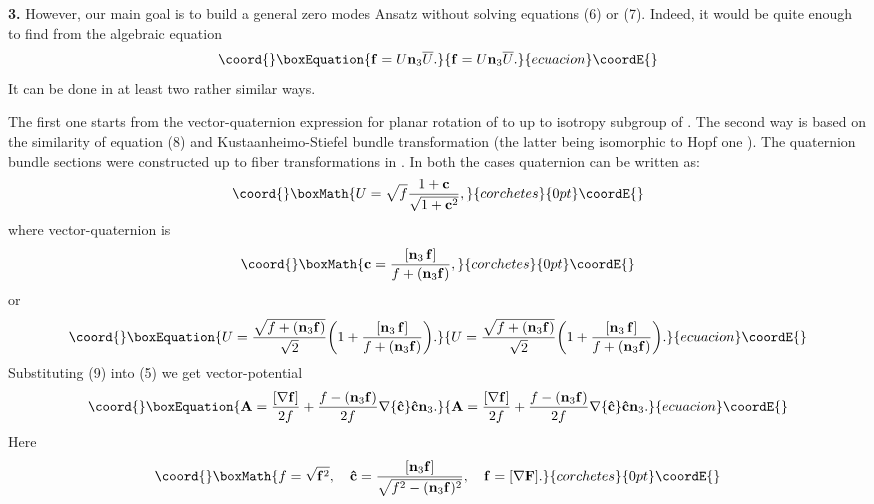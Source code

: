 \documentclass[12pt,a4paper]{article}
\begin{document}
{\bf 3.} However, our main goal is to build a general zero modes Ansatz without solving
equations (6) or (7). Indeed,  it would be quite enough to find \coordHE{} from
the algebraic equation
\begin{equation}\coord{}\boxEquation{
\mathbf{f}=U\mathbf{n}_3\overline{U}.
}{
\mathbf{f}=U\mathbf{n}_3\overline{U}.
}{ecuacion}\coordE{}\end{equation}
It can be done in at least two rather similar ways.

The first one starts from the vector-quaternion expression for planar \coordHE{} rotation of
\coordHE{} to \coordHE{} up to \coordHE{} isotropy subgroup of \coordHE{}
\cite{Fedorov}. The second way is based on the similarity of equation (8) and
Kustaanheimo-Stiefel bundle transformation \coordHE{}
(the latter being isomorphic to Hopf one \coordHE{}). The quaternion bundle
sections were constructed up to \coordHE{} fiber transformations in \cite{Pris1}.
In both the cases quaternion \coordHE{} can be written as:
\begin{displaymath}\coord{}\boxMath{
U=\sqrt{f}\frac{1+\mathbf{c}}{\sqrt{1+\mathbf{c}^2}},
}{corchetes}{0pt}\coordE{}\end{displaymath}
where vector-quaternion \coordHE{} is
\begin{displaymath}\coord{}\boxMath{
\mathbf{c}=
\frac{[\mathbf{n}_3\, \mathbf{f}]}{f+(\mathbf{n}_3\mathbf{f})},
}{corchetes}{0pt}\coordE{}\end{displaymath}
or
\begin{equation}\coord{}\boxEquation{
U =\frac{\sqrt{f+(\mathbf{n}_3\mathbf{f})}}{\sqrt{2}}\biggl(1+
\frac{[\mathbf{n}_3\, \mathbf{f}]}{f+(\mathbf{n}_3\mathbf{f})}
\biggr).
}{
U =\frac{\sqrt{f+(\mathbf{n}_3\mathbf{f})}}{\sqrt{2}}\biggl(1+
\frac{[\mathbf{n}_3\, \mathbf{f}]}{f+(\mathbf{n}_3\mathbf{f})}
\biggr).
}{ecuacion}\coordE{}\end{equation}
Substituting (9) into (5) we get vector-potential
\begin{equation}\coord{}\boxEquation{
\mathbf{A}=\frac{[\mathbf{\nabla}\mathbf{f}]}{2f}+
\frac{f-(\mathbf{n}_3\mathbf{f})}{2f}
\mathbf{\nabla}\{\mathbf{\hat{c}}\}\mathbf{\hat{c}}
\mathbf{n}_3.
}{
\mathbf{A}=\frac{[\mathbf{\nabla}\mathbf{f}]}{2f}+
\frac{f-(\mathbf{n}_3\mathbf{f})}{2f}
\mathbf{\nabla}\{\mathbf{\hat{c}}\}\mathbf{\hat{c}}
\mathbf{n}_3.
}{ecuacion}\coordE{}\end{equation}
Here
\begin{displaymath}\coord{}\boxMath{
f=\sqrt{\mathbf{f}^2}, \quad
\mathbf{\hat{c}}=
\frac{[\mathbf{n}_3\mathbf{f}]}{\sqrt{f^2-(\mathbf{n}_3\mathbf{f})^2}}, \quad
\mathbf{f}=[\mathbf{\nabla}\mathbf{F}].
}{corchetes}{0pt}\coordE{}\end{displaymath}
\end{document}
